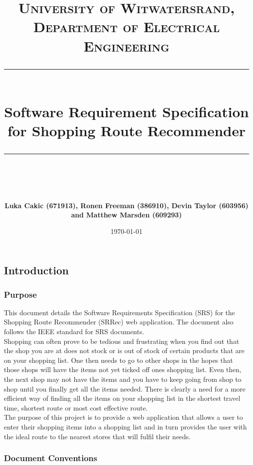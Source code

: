 \documentclass[10pt, a4paper, onecolumn]{scrartcl}
\newcommand{\horrule}[1]{\rule{\linewidth}{#1}}
\begin{document}
	
	\title{\normalfont \normalsize
		\textsc{University of Witwatersrand, Department of Electrical Engineering} \\ [10pt]
		\horrule{0.5pt} \\ [10pt]
		\huge Software Requirement Specification for Shopping Route Recommender \\
		\horrule{2pt} \\ [10pt]}
	\author{\textbf{\normalsize{Luka Cakic (671913), Ronen Freeman (386910), Devin Taylor (603956) and Matthew Marsden (609293)}} \\ [10pt]}
	\date {\normalsize \today}
	
	\maketitle
	
	
	\subsection{Introduction}
	
		\subsubsection{Purpose}
		
			This document details the Software Requirements Specification (SRS) for the Shopping Route Recommender (SRRec) web application. The document also follows the IEEE standard for SRS documents.\\
			
			Shopping can often prove to be tedious and frustrating when you find out that the shop you are at does not stock or is out of stock of certain products that are on your shopping list. One then needs to go to other shops in the hopes that those shops will have the items not yet ticked off ones shopping list. Even then, the next shop may not have the items and you have to keep going from shop to shop until you finally get all the items needed. There is clearly a need for a more efficient way of finding all the items on your shopping list in the shortest travel time, shortest route or most cost effective route.\\
			
			The purpose of this project is to provide a web application that allows a user to enter their shopping items into a shopping list and in turn provides the user with the ideal route to the nearest stores that will fulfil their needs.
		
		\subsubsection{Document Conventions}
		
\end{document}
